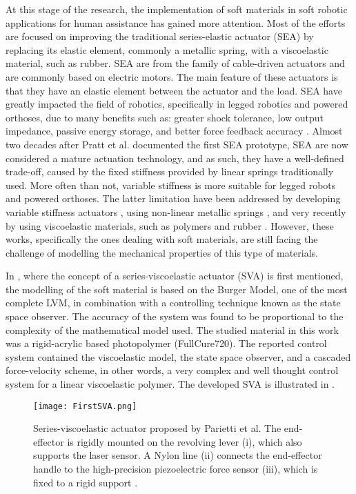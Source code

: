 At this stage of the research, the implementation of soft materials in soft robotic applications for human assistance has gained more attention. Most of the efforts are focused on improving the traditional series-elastic actuator (SEA) by replacing its elastic element, commonly a metallic spring, with a viscoelastic material, such as rubber. SEA are from the family of cable-driven actuators and are commonly based on electric motors. The main feature of these actuators is that they have an elastic element between the actuator and the load. SEA have greatly impacted the field of robotics, specifically in legged robotics and powered orthoses, due to many benefits such as: greater shock tolerance, low output impedance, passive energy storage, and better force feedback accuracy \cite{pratt1995series,pratt2004series,au2008powered}. Almost two decades after Pratt et al. documented the first SEA prototype, SEA are now considered a mature actuation technology, and as such, they have a well-defined trade-off, caused by the fixed stiffness provided by linear springs traditionally used. More often than not, variable stiffness is more suitable for legged robots and powered orthoses. The latter limitation have been addressed by developing variable stiffness actuators \cite{groothuis2012vsaut}, using non-linear metallic springs \cite{migliore2007novel}, and very recently by using viscoelastic materials, such as polymers and rubber \cite{rollinson2013design,parietti2011series,schepelmann2014compact}. However, these works, specifically the ones dealing with soft materials, are still facing the challenge of modelling the mechanical properties of this type of materials. 

In \cite{parietti2011series}, where the concept of a series-viscoelastic actuator (SVA) is first mentioned, the modelling of the soft material is based on the Burger Model, one of the most complete LVM, in combination with a controlling technique known as the state space observer. The accuracy of the system was found to be proportional to the complexity of the mathematical model used. The studied material in this work was a rigid-acrylic based photopolymer (FullCure720). The reported control system contained the viscoelastic model, the state space observer, and a cascaded force-velocity scheme, in other words, a very complex and well thought control system for a linear viscoelastic polymer. The developed SVA is illustrated in . 

\begin{figure}[htb!]
	\centering
	\texttt{[image: FirstSVA.png]}
	\caption{Series-viscoelastic actuator proposed by Parietti et al. The end-effector is rigidly mounted on the revolving lever (i), which also supports the laser sensor. A Nylon line (ii) connects the end-effector handle to the high-precision piezoelectric force sensor (iii), which is fixed to a rigid support \cite{parietti2011series}.}
	\label{fig:firstSVA}
\end{figure}

